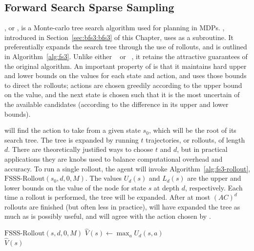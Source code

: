 \subsection{Forward Search Sparse Sampling}

, or , is a Monte-carlo tree search algorithm used for planning in MDPs. , introduced in Section~\ref{sec:bfs3:bfs3} of this Chapter, uses  as a subroutine.  It preferentially expands the search tree through the use of rollouts, and is outlined in Algorithm~\ref{alg:fs3}. Unlike either ~\cite{wang05} or ~\cite{kocsis06}, it retains the attractive guarantees of the original  algorithm. An important property of  is that it maintains hard upper and lower bounds  on the values for each state and action, and uses those bounds to direct the rollouts; actions are chosen greedily according to the upper bound on the value, and the next state is chosen such that it is the most uncertain of the available candidates (according to the difference in its upper and lower bounds).

  will find the action to take from a given state $s_0$, which will be the root of its search tree.  The tree is expanded by running $t$ trajectories, or rollouts, of length $d$. There are theoretically justified ways to choose $t$ and $d$, but in practical applications they are knobs used to balance computational overhead and accuracy. To run a single rollout, the agent will invoke Algorithm~\ref{alg:fs3-rollout}, $\mbox{FSSS-Rollout}(s_0, d, 0, M)$.
The values $U_d(s)$ and $L_d(s)$ are the upper and lower bounds on the value of the node for state $s$ at depth $d$, respectively. Each time a rollout is performed, the tree will be expanded. After at most $(AC)^d$ rollouts are finished (but often less in practice),  will have expanded the tree as much as is possibly useful, and will agree with the action chosen by .

\begin{algorithm}[tb]
	\caption{$\mbox{FSSS}(s, d, t, M)$}
	\label{alg:fs3}

	 {
		$\mbox{FSSS-Rollout}(s, d, 0, M)$
	}
	$\hat V(s) \leftarrow \max_a U_d(s, a)$\\
	\Return $\hat V(s)$
\end{algorithm}

